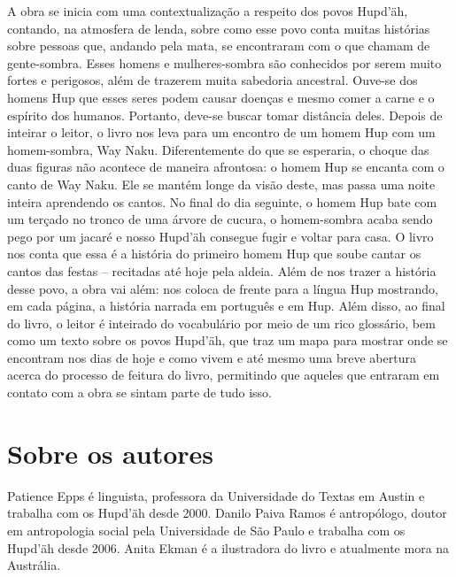 \documentclass[11pt]{extarticle}
\begin{document}
A obra se inicia com uma contextualização a respeito dos povos Hupd'äh, contando, na atmosfera de lenda, sobre como esse povo conta muitas histórias sobre pessoas que, andando pela mata, se encontraram com o que chamam de gente-sombra. Esses homens e mulheres-sombra são conhecidos por serem muito fortes e perigosos, além de trazerem muita sabedoria ancestral. Ouve-se dos homens Hup que esses seres podem causar doenças e mesmo comer a carne e o espírito dos humanos. Portanto, deve-se buscar tomar distância deles. Depois de inteirar o leitor, o livro nos leva para um encontro de um homem Hup com um homem-sombra, Way Naku. Diferentemente do que se esperaria, o choque das duas figuras não acontece de maneira afrontosa: o homem Hup se encanta com o canto de Way Naku. Ele se mantém longe da visão deste, mas passa uma noite inteira aprendendo os cantos. No final do dia seguinte, o homem Hup bate com um terçado no tronco de uma árvore de cucura, o homem-sombra acaba sendo pego por um jacaré e nosso Hupd'äh consegue fugir e voltar para casa. O livro nos conta que essa é a história do primeiro homem Hup que soube cantar os cantos das festas -- recitadas até hoje pela aldeia. Além de nos trazer a história desse povo, a obra vai além: nos coloca de frente para a língua Hup mostrando, em cada página, a história narrada em português e em Hup. Além disso, ao final do livro, o leitor é inteirado do vocabulário por meio de um rico glossário, bem como um texto sobre os povos Hupd'äh, que traz um mapa para mostrar onde se encontram nos dias de hoje e como vivem e até mesmo uma breve abertura acerca do processo de feitura do livro, permitindo que aqueles que entraram em contato com a obra se sintam parte de tudo isso.

\section{Sobre os autores}

Patience Epps é linguista, professora da Universidade do Textas em Austin e trabalha com os Hupd'äh desde 2000. Danilo Paiva Ramos é antropólogo, doutor em antropologia social pela Universidade de São Paulo e trabalha com os Hupd'äh desde 2006. Anita Ekman é a ilustradora do livro e atualmente mora na Austrália. 


\end{document}
